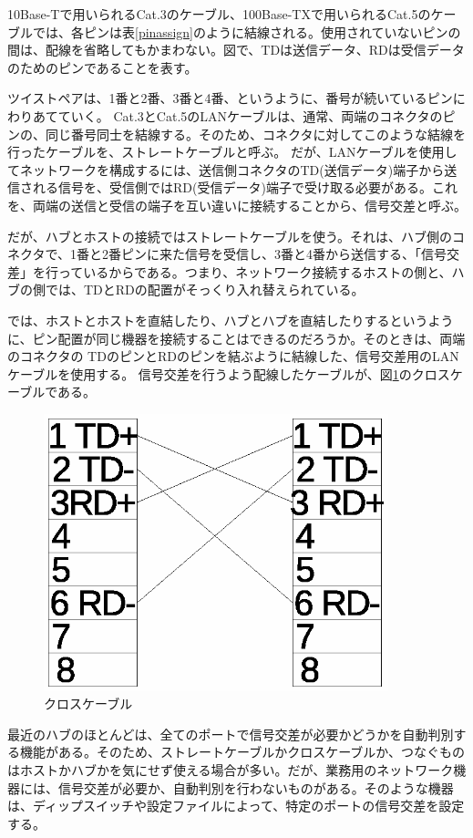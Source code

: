 10Base-Tで用いられるCat.3のケーブル、100Base-TXで用いられるCat.5のケーブルでは、各ピンは表\ref{pinassign}のように結線される。使用されていないピンの間は、配線を省略してもかまわない。図で、TDは送信データ、RDは受信データのためのピンであることを表す。

ツイストペアは、1番と2番、3番と4番、というように、番号が続いているピンにわりあてていく。
Cat.3とCat.5のLANケーブルは、通常、両端のコネクタのピンの、同じ番号同士を結線する。そのため、コネクタに対してこのような結線を行ったケーブルを、ストレートケーブルと呼ぶ。
だが、LANケーブルを使用してネットワークを構成するには、送信側コネクタのTD(送信データ)端子から送信される信号を、受信側ではRD(受信データ)端子で受け取る必要がある。これを、両端の送信と受信の端子を互い違いに接続することから、信号交差と呼ぶ。

だが、ハブとホストの接続ではストレートケーブルを使う。それは、ハブ側のコネクタで、1番と2番ピンに来た信号を受信し、3番と4番から送信する、「信号交差」を行っているからである。つまり、ネットワーク接続するホストの側と、ハブの側では、TDとRDの配置がそっくり入れ替えられている。

では、ホストとホストを直結したり、ハブとハブを直結したりするというように、ピン配置が同じ機器を接続することはできるのだろうか。そのときは、両端のコネクタの TDのピンとRDのピンを結ぶように結線した、信号交差用のLANケーブルを使用する。
信号交差を行うよう配線したケーブルが、図\ref{fig:cross}のクロスケーブルである。

\begin{figure}[htbp]
	\includegraphics[width=10cm,clip]{draw/cat5cross.eps}
	\caption{クロスケーブル}
	\label{fig:cross}
\end{figure}


最近のハブのほとんどは、全てのポートで信号交差が必要かどうかを自動判別する機能がある。そのため、ストレートケーブルかクロスケーブルか、つなぐものはホストかハブかを気にせず使える場合が多い。だが、業務用のネットワーク機器には、信号交差が必要か、自動判別を行わないものがある。そのような機器は、ディップスイッチや設定ファイルによって、特定のポートの信号交差を設定する。

